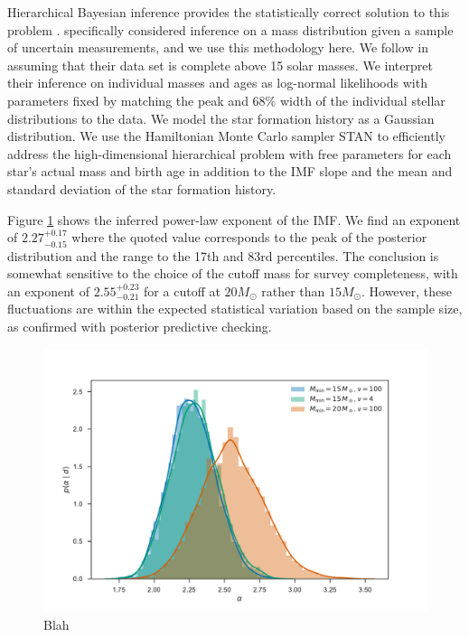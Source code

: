 \documentclass[apjl]{emulateapj}
\newcommand{\onesigrange}[3]{\ensuremath{#1^{+#2}_{-#3}}}
\newcommand{\alpharange}{\onesigrange{2.27}{0.17}{0.15}}
\newcommand{\alpharangeHM}{\onesigrange{2.55}{0.23}{0.21}}
\begin{document}
Hierarchical Bayesian inference provides the statistically correct solution to this problem \cite{Hogg:2010}.  \citet{Mandel:2010stat} specifically considered inference on a mass distribution given a sample of uncertain measurements, and we use this methodology here.  We follow \citet{Schneider:2018} in assuming that their data set is complete above 15 solar masses.  We interpret their inference on individual masses and ages as log-normal likelihoods with parameters fixed by matching the peak and 68\% width of the individual stellar distributions to the \citet{Schneider:2018} data.  We model the star formation history as a Gaussian distribution.  We use the Hamiltonian Monte Carlo sampler STAN \cite{STAN} to efficiently address the high-dimensional hierarchical problem with free parameters for each star's actual mass and birth age in addition to the IMF slope and the mean and standard deviation of the star formation history.

Figure \ref{fig:IMF} shows the inferred power-law exponent of the IMF.  We find
an exponent of $\alpharange$ where the quoted value corresponds to the peak of
the posterior distribution and the range to the 17th and 83rd percentiles.  The
conclusion is somewhat sensitive to the choice of the cutoff mass for survey
completeness, with an exponent of $\alpharangeHM$ for a cutoff at $20 M_\odot$
rather than $15 M_\odot$.  However, these fluctuations are within the expected
statistical variation based on the sample size, as confirmed with posterior
predictive checking.

\begin{figure}
    		    		\includegraphics[trim={0cm 0cm 0cm 0cm},clip,scale=0.4]{alpha.pdf}
    		\caption{Blah}\label{fig:IMF}
\end{figure}
\end{document}
